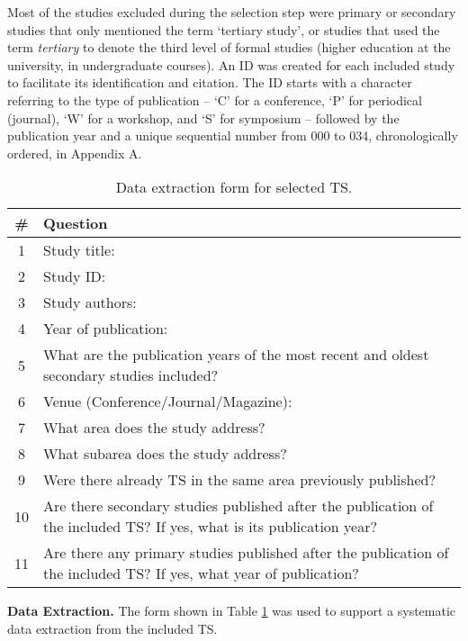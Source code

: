 \documentclass[sigconf]{acmart}
\begin{document}
Most of the studies excluded during the selection step were primary or secondary studies that only mentioned the term `tertiary study', or studies that used the term \textit{tertiary} to denote the third level of formal studies (higher education at the university, in undergraduate courses). %
An ID was created for each included study to facilitate its identification and citation. The ID starts with a character referring to the type of publication -- `C' for a conference, `P' for periodical (journal), `W' for a workshop, and `S' for symposium -- followed by the publication year and a unique sequential number from 000 to 034, chronologically ordered, in Appendix A.


\begin{table}[!ht]
\small
\centering
\caption{Data extraction form for selected TS.}
\label{tab:form}
\begin{tabular}{|c|p{7cm}|}
\hline \# & Question\\
\hline 1 & Study title:\\
\hline 2 & Study ID:\\
\hline 3 & Study authors:\\
\hline 4 & Year of publication:\\
\hline 5 & What are the publication years of the most recent and oldest secondary studies included?\\
\hline 6 & Venue (Conference/Journal/Magazine):\\
\hline 7 & What area does the study address? \\
\hline 8 & What subarea does the study address? \\
\hline 9 & Were there already TS in the same area previously published? \\
\hline 10 & Are there secondary studies published after the publication of the included TS? If yes, what is its publication year? \\
\hline {11} & Are there any primary studies published after the publication of the included TS? If yes, what year of publication?\\
\hline
\end{tabular}
\end{table}

\noindent \textbf{Data Extraction.} The form shown in Table \ref{tab:form} was used to support a systematic data extraction from the included TS.
\vspace{-0.2cm}
\end{document}
